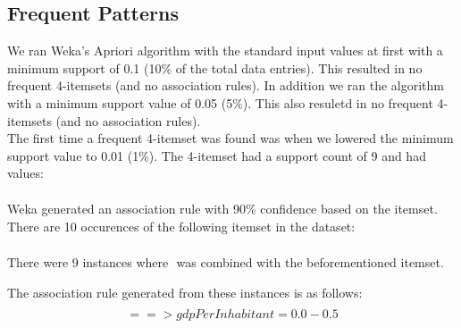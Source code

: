 \subsection{Frequent Patterns}
\label{Res_FP}
We ran Weka's Apriori algorithm with the standard input values at first with a minimum support of 0.1 (10\% of the total data entries). This resulted in no frequent 4-itemsets (and no association rules). In addition we ran the algorithm with a minimum support value of 0.05 (5\%). This also resuletd in no frequent 4-itemsets (and no association rules).
\\The first time a frequent 4-itemset was found was when we lowered the minimum support value to 0.01 (1\%). The 4-itemset had a support count of 9 and had values:
\begin{align*}
	[unemploymentRate=2.0-2.5; \\
	balanceOfPayments=1.0-1.5; \\
	gdpPerInhabitant=0.0-0.5; \\
	population=0.0-0.5]
\end{align*}

Weka generated an association rule with 90\% confidence based on the itemset. 
\\There are 10 occurences of the following itemset in the dataset:
\begin{align*}
	[unemploymentRate=2.0-2.5;\\
	balanceOfPayments=1.0-1.5;\\ 
	population=0.0-0.5]
\end{align*}

There were 9 instances where \begin{math}[gdpPerInhabitant=0.0-0.5]\end{math} was combined with the beforementioned itemset.

The association rule generated from these instances is as follows:
\begin{align*}
	[unemploymentRate=2.0-2.5;\\
	balanceOfPayments=1.0-1.5;\\ 
	population=0.0-0.5]
	\\==> gdpPerInhabitant=0.0-0.5
\end{align*}

